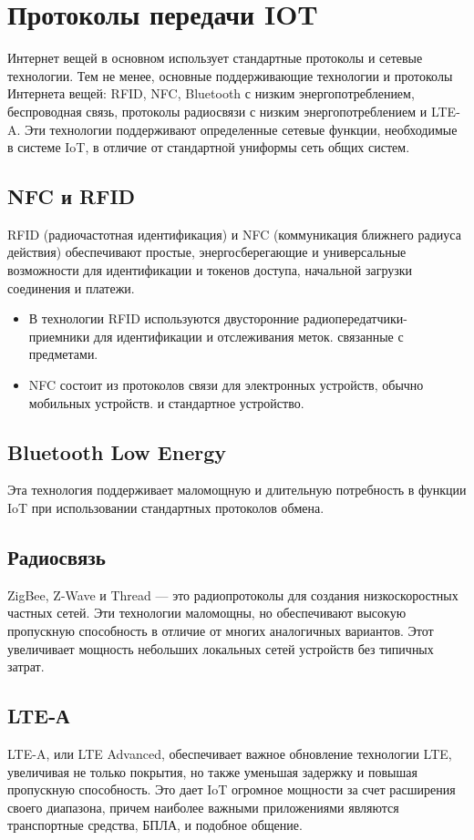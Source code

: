 \section{Протоколы передачи IOT}
Интернет вещей в основном использует стандартные протоколы и сетевые технологии. Тем не менее, основные
поддерживающие технологии и протоколы Интернета вещей: RFID, NFC, Bluetooth с низким энергопотреблением,
беспроводная связь, протоколы радиосвязи с низким энергопотреблением и LTE-A. Эти технологии поддерживают
определенные сетевые функции, необходимые в системе IoT, в отличие от стандартной униформы
сеть общих систем.

\subsection{NFC и RFID}
RFID (радиочастотная идентификация) и NFC (коммуникация ближнего радиуса действия) обеспечивают простые, энергосберегающие и универсальные возможности для идентификации и токенов доступа, начальной загрузки соединения и
платежи.
\begin{itemize}
    \item В технологии RFID используются двусторонние радиопередатчики-приемники для идентификации и отслеживания меток.
    связанные с предметами.
    \item NFC состоит из протоколов связи для электронных устройств, обычно мобильных устройств.
    и стандартное устройство.
\end{itemize}


\subsection{Bluetooth Low Energy}
Эта технология поддерживает маломощную и длительную потребность в функции IoT при использовании стандартных протоколов обмена.

\subsection{Радиосвязь}
ZigBee, Z-Wave и Thread — это радиопротоколы для создания низкоскоростных частных сетей.
Эти технологии маломощны, но обеспечивают высокую пропускную способность в отличие от многих аналогичных вариантов. Этот
увеличивает мощность небольших локальных сетей устройств без типичных затрат.

\subsection{LTE-А}
LTE-A, или LTE Advanced, обеспечивает важное обновление технологии LTE, увеличивая не только
покрытия, но также уменьшая задержку и повышая пропускную способность. Это дает IoT огромное
мощности за счет расширения своего диапазона, причем наиболее важными приложениями являются транспортные средства, БПЛА,
и подобное общение.

